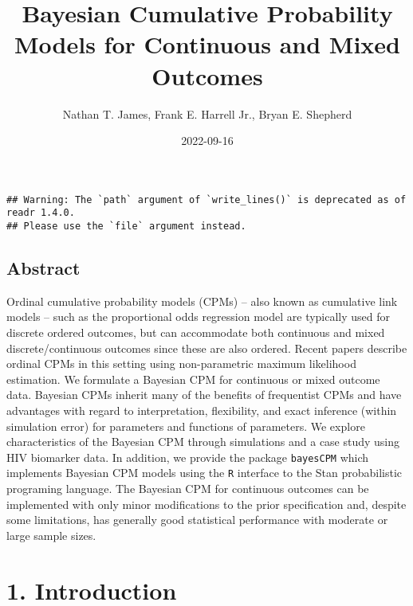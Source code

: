 \documentclass[
]{article}
\title{Bayesian Cumulative Probability Models for Continuous and Mixed Outcomes}
\author{Nathan T. James, Frank E. Harrell Jr., Bryan E. Shepherd}
\date{2022-09-16}
\begin{document}
\maketitle

\begin{verbatim}
## Warning: The `path` argument of `write_lines()` is deprecated as of readr 1.4.0.
## Please use the `file` argument instead.
\end{verbatim}

\hypertarget{abstract}{%
\subsection{Abstract}\label{abstract}}

Ordinal cumulative probability models (CPMs) -- also known as cumulative link models -- such as the proportional odds regression model are typically used for discrete ordered outcomes, but can accommodate both continuous and mixed discrete/continuous outcomes since these are also ordered. Recent papers describe ordinal CPMs in this setting using non-parametric maximum likelihood estimation. We formulate a Bayesian CPM for continuous or mixed outcome data. Bayesian CPMs inherit many of the benefits of frequentist CPMs and have advantages with regard to interpretation, flexibility, and exact inference (within simulation error) for parameters and functions of parameters. We explore characteristics of the Bayesian CPM through simulations and a case study using HIV biomarker data. In addition, we provide the package \texttt{bayesCPM} which implements Bayesian CPM models using the \texttt{R} interface to the Stan probabilistic programing language. The Bayesian CPM for continuous outcomes can be implemented with only minor modifications to the prior specification and, despite some limitations, has generally good statistical performance with moderate or large sample sizes.

\hypertarget{introduction}{%
\section{1. Introduction}\label{introduction}}
\end{document}
